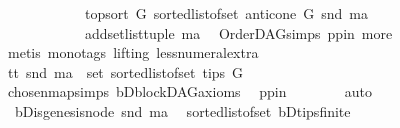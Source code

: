 \begin{isabellebody}
\ \ \ \ \ \ \ \ \ \ \ \ {\isacharparenleft}{\kern0pt}top{\isacharunderscore}{\kern0pt}sort\ G\ {\isacharparenleft}{\kern0pt}sorted{\isacharunderscore}{\kern0pt}list{\isacharunderscore}{\kern0pt}of{\isacharunderscore}{\kern0pt}set\ {\isacharparenleft}{\kern0pt}anticone\ G\ {\isacharparenleft}{\kern0pt}snd\ ma{\isacharparenright}{\kern0pt}{\isacharparenright}{\kern0pt}{\isacharparenright}{\kern0pt}{\isacharparenright}{\kern0pt}\isanewline
\ \ \ \ \ \ \ \ \ \ \ \ {\isacharparenleft}{\kern0pt}add{\isacharunderscore}{\kern0pt}set{\isacharunderscore}{\kern0pt}list{\isacharunderscore}{\kern0pt}tuple\ ma{\isacharparenright}{\kern0pt}{\isachardoublequoteclose}\ \isamarkupfalse%
\ OrderDAG{\isachardot}{\kern0pt}simps\ pp{\isacharunderscore}{\kern0pt}in\ more\isanewline
\ \ \ \ \ \ \isamarkupfalse%
\ {\isacharparenleft}{\kern0pt}metis\ {\isacharparenleft}{\kern0pt}mono{\isacharunderscore}{\kern0pt}tags{\isacharcomma}{\kern0pt}\ lifting{\isacharparenright}{\kern0pt}\ less{\isacharunderscore}{\kern0pt}numeral{\isacharunderscore}{\kern0pt}extra{\isacharparenleft}{\kern0pt}{}{\isacharparenright}{\kern0pt}{\isacharparenright}{\kern0pt}\ \isanewline
\ \ \ \ \isamarkupfalse%
\ tt{\isacharcolon}{\kern0pt}\ {\isachardoublequoteopen}snd\ ma\ {\isasymin}\ set\ {\isacharparenleft}{\kern0pt}sorted{\isacharunderscore}{\kern0pt}list{\isacharunderscore}{\kern0pt}of{\isacharunderscore}{\kern0pt}set\ {\isacharparenleft}{\kern0pt}tips\ G{\isacharparenright}{\kern0pt}{\isacharparenright}{\kern0pt}{\isachardoublequoteclose}\ \isanewline
\ \ \ \ \ \ \isamarkupfalse%
\ chosen{\isacharunderscore}{\kern0pt}map{\isacharunderscore}{\kern0pt}simps{\isacharparenleft}{\kern0pt}{}{\isacharparenright}{\kern0pt}\ bD{\isachardot}{\kern0pt}blockDAG{\isacharunderscore}{\kern0pt}axioms\ \isamarkupfalse%
\ pp{\isacharunderscore}{\kern0pt}in\isanewline
\ \ \ \ \ \ \isamarkupfalse%
\ auto\ \isanewline
\ \ \ \ \isamarkupfalse%
\ \isamarkupfalse%
\ {\isachardoublequoteopen}{\isasymnot}\ bD{\isachardot}{\kern0pt}is{\isacharunderscore}{\kern0pt}genesis{\isacharunderscore}{\kern0pt}node\ {\isacharparenleft}{\kern0pt}snd\ ma{\isacharparenright}{\kern0pt}{\isachardoublequoteclose}\ \isamarkupfalse%
\ sorted{\isacharunderscore}{\kern0pt}list{\isacharunderscore}{\kern0pt}of{\isacharunderscore}{\kern0pt}set{\isacharparenleft}{\kern0pt}{}{\isacharparenright}{\kern0pt}\ bD{\isachardot}{\kern0pt}tips{\isacharunderscore}{\kern0pt}finite\ \isanewline

\end{isabellebody}
